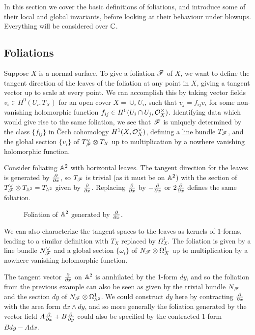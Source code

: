 
In this section we cover the basic definitions of foliations, and introduce some
of their local and global invariants, before looking at their behaviour under
blowups. Everything will be considered over $\mathbb{C}$.

\subsection{Foliations}

Suppose $X$ is a normal surface. To give a foliation $\mathscr{F}$ of $X$, we want to
define the tangent direction of the leaves of the foliation at any point in $X$,
giving a tangent vector up to scale at every point. We can accomplish this by
taking vector fields $v_i\in H^0(U_i,T_X)$ for an open cover $X=\cup_iU_i$, such
that $v_j=f_{ij}v_i$ for some non-vanishing holomorphic function
$f_{ij}\in H^0(U_i\cap U_j,\mathcal{O}_X^\times)$. Identifying data which would give rise
to the same foliation, we see that $\mathscr{F}$ is uniquely determined by the class
$\{f_{ij}\}$ in \v{C}ech cohomology $H^1(X,\mathcal{O}_X^\times)$, defining a line bundle
$T_{\mathscr{F}}$, and the global section $\{v_i\}$ of $T_{\mathscr{F}}^\vee\otimes T_X$ up to
multiplication by a nowhere vanishing holomorphic function.

\begin{example}
    Consider foliating $\mathbb{A}^2$ with horizontal leaves. The tangent direction for
    the leaves is generated by $\pdv{}{x}$, so $T_{\mathscr{F}}$ is trivial (as it must
    be on $\mathbb{A}^2$) with the section of $T_{\mathscr{F}}^\vee\otimes T_{\mathbb{A}^2}=T_{\mathbb{A}^2}$ given
    by $\pdv{}{x}$. Replacing $\pdv{}{x}$ by $-\pdv{}{x}$ or $2\pdv{}{x}$
    defines the same foliation.
    \begin{figure}[H]
        \centering
        \caption{Foliation of $\mathbb{A}^2$ generated by $\pdv{}{x}$.}
    \end{figure}
\end{example}

We can also characterize the tangent spaces to the leaves as kernels of 1-forms,
leading to a similar definition with $T_X$ replaced by $\Omega^1_X$. The
foliation is given by a line bundle $N_{\mathscr{F}}^\vee$ and a global section
$\{\omega_i\}$ of $N_{\mathscr{F}}\otimes\Omega^1_X$ up to multiplication by a nowhere
vanishing holomorphic function.

\begin{example}
    The tangent vector $\pdv{}{x}$ on $\mathbb{A}^2$ is annhilated by the 1-form $dy$,
    and so the foliation from the previous example can also be seen as given by
    the trivial bundle $N_{\mathscr{F}}$ and the section $dy$ of
    $N_{\mathscr{F}}\otimes\Omega^1_{\mathbb{A}^2}$. We could construct $dy$ here by contracting
    $\pdv{}{x}$ with the area form $dx\wedge dy$, and so more generally the
    foliation generated by the vector field $A\pdv{}{x}+B\pdv{}{y}$ could also
    be specified by the contracted 1-form $Bdy-Adx$.
\end{example}

